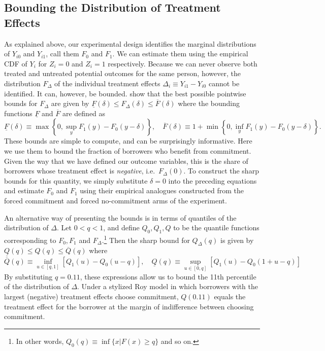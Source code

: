 \documentclass[oneside,11pt]{article}
\begin{document}
\subsection{Bounding the Distribution of Treatment Effects}

As explained above, our experimental design identifies the marginal distributions of $Y_{i0}$ and $Y_{i1}$, call them $F_0$ and $F_1$. We can estimate them using the empirical CDF of $Y_i$ for $Z_i=0$ and $Z_i = 1$ respectively. Because we can never observe both treated and untreated potential outcomes for the same person, however, the distribution $F_\Delta$ of the individual treatment effects $\Delta_i \equiv Y_{i1} - Y_{i0}$ cannot be identified. It can, however, be bounded. \cite{fan2010sharp} show that the best possible pointwise bounds for $F_\Delta$ are given by $\underline{F}(\delta) \leq F_\Delta(\delta) \leq \overline{F}(\delta)$ where the bounding functions $\underline{F}$ and $\overline{F}$ are defined as 
\[
\underline{F}(\delta) \equiv \max \left\{0, \sup_y F_1(y) - F_0(y - \delta)  \right\}, \quad
\overline{F}(\delta) \equiv 1 + \min \left\{0, \inf_y F_1(y) - F_0(y-\delta) \right\}.
\]
These bounds are simple to compute, and can be surprisingly informative. Here we use them to bound the fraction of borrowers who benefit from commitment. Given the way that we have defined our outcome variables, this is the share of borrowers whose treatment effect is \emph{negative}, i.e.\ $F_\Delta(0)$. To construct the sharp bounds for this quantity, we simply substitute $\delta = 0$ into the preceding equations and estimate $F_0$ and $F_1$ using their empirical analogues constructed from the forced commitment and forced no-commitment arms of the experiment.


An alternative way of presenting the \cite{fan2010sharp} bounds is in terms of quantiles of the distribution of $\Delta$. Let $0 < q < 1$, and define $Q_0, Q_1, Q$ to be the quantile functions corresponding to $F_0, F_1$ and $F_\Delta$.\footnote{In other words, $Q_0(q) \equiv \inf \{x | F(x) \geq q\}$ and so on.} Then the sharp bound for $Q_\Delta(q)$ is given by $\underline{Q}(q) \leq Q(q) \leq \overline{Q}(q)$ where
\[
\overline{Q}(q) \equiv \inf_{u \in [q,1]} [Q_1(u) - Q_0(u - q)], \quad
\underline{Q}(q) \equiv \sup_{u\in [0,q]} [Q_1(u) - Q_0(1 + u - q)]
\]
By substituting $q = 0.11$, these expressions allow us to bound the 11th percentile of the distribution of $\Delta$. Under a stylized Roy model in which borrowers with the largest (negative) treatment effects choose commitment, $Q(0.11)$ equals the treatment effect for the borrower at the margin of indifference between choosing commitment. 
\end{document}
